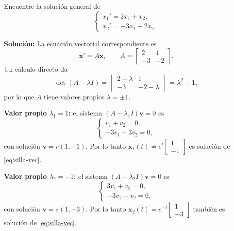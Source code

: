 \begin{example}\label{ex:silla}
Encuentre la soluci\'on general de
\begin{equation}\label{eq:silla-esc}
\begin{cases}
x_1' = 2x_1 + x_2, \\
x_2' = -3x_1 - 2x_2.
\end{cases}
\end{equation}

\textbf{Soluci\'on:} La ecuaci\'on vectorial correspondiente es
\begin{equation}\label{eq:silla-vec}
\mathbf{x}' = A\mathbf{x}, \qquad A = \begin{bmatrix} 2 & 1 \\ -3 & -2 \end{bmatrix}.
\end{equation}
Un c\'alculo directo da
\[
\det(A - \lambda I) =
\begin{vmatrix} 2 - \lambda & 1 \\ -3 & -2 - \lambda \end{vmatrix}
= \lambda^2 - 1,
\]
por lo que $A$ tiene valores propios $\lambda = \pm 1$.

\textbf{Valor propio $\lambda_1 = 1$:} el sistema $(A - \lambda_1 I)\mathbf{v} = 0$ es
\[
\begin{cases} v_1 + v_2 = 0, \\ -3v_1 - 3v_2 = 0, \end{cases}
\]
con soluci\'on $\mathbf{v} = r(1, -1)$. Por lo tanto $\mathbf{x}_1(t) = e^{t}\begin{bmatrix} 1 \\ -1 \end{bmatrix}$ es soluci\'on de \eqref{eq:silla-vec}.

\textbf{Valor propio $\lambda_2 = -1$:} el sistema $(A - \lambda_2 I)\mathbf{v} = 0$ es
\[
\begin{cases} 3v_1 + v_2 = 0, \\ -3v_1 - v_2 = 0, \end{cases}
\]
con soluci\'on $\mathbf{v} = s(1, -3)$. Por lo tanto $\mathbf{x}_2(t) = e^{-t}\begin{bmatrix} 1 \\ -3 \end{bmatrix}$ tambi\'en es soluci\'on de \eqref{eq:silla-vec}.


\end{example}
